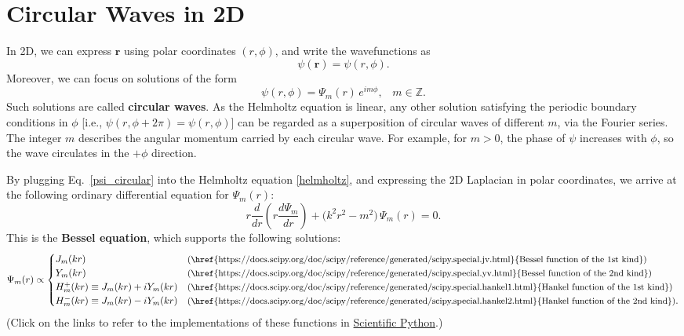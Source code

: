 \documentclass[pra,12pt]{revtex4-2}
\begin{document}
\section{Circular Waves in 2D}
\label{circular_waves}

In 2D, we can express $\mathbf{r}$ using polar coordinates $(r,
\phi)$, and write the wavefunctions as
\begin{equation}
  \psi(\mathbf{r}) = \psi(r,\phi).
\end{equation}
Moreover, we can focus on solutions of the form
\begin{equation}
  \psi(r,\phi) = \Psi_m(r)\, e^{im\phi}, \;\;\;m \in\mathbb{Z}.
  \label{psi_circular}
\end{equation}
Such solutions are called \textbf{circular waves}.  As the Helmholtz
equation is linear, any other solution satisfying the periodic
boundary conditions in $\phi$ [i.e., $\psi(r,\phi + 2\pi) = \psi(r,
  \phi)$] can be regarded as a superposition of circular waves of
different $m$, via the Fourier series.  The integer $m$ describes the
angular momentum carried by each circular wave.  For example, for $m >
0$, the phase of $\psi$ increases with $\phi$, so the wave circulates
in the $+\phi$ direction.

By plugging Eq.~\eqref{psi_circular} into the Helmholtz equation
\eqref{helmholtz}, and expressing the 2D Laplacian in polar
coordinates, we arrive at the following ordinary differential equation
for $\Psi_m(r)$:
\begin{equation}
  r \frac{d}{dr}\!\left(r \frac{d\Psi_m}{dr} \right)
  + \Big(k^2 r^2 - m^2 \Big)\, \Psi_m(r) = 0.
  \label{besseleq}
\end{equation}
This is the \textbf{Bessel equation}, which supports the following
solutions:
\begin{equation}
  \Psi_m(r) \propto \begin{cases}
    J_m(kr) &\text{\small(\href{https://docs.scipy.org/doc/scipy/reference/generated/scipy.special.jv.html}{Bessel function of the 1st kind})} \\
    Y_m(kr) &\text{\small(\href{https://docs.scipy.org/doc/scipy/reference/generated/scipy.special.yv.html}{Bessel function of the 2nd kind})} \\
    H_m^+(kr) \equiv J_m(kr) + i Y_m(kr) &\text{\small(\href{https://docs.scipy.org/doc/scipy/reference/generated/scipy.special.hankel1.html}{Hankel function of the 1st kind})} \\
    H_m^-(kr) \equiv J_m(kr) - i Y_m(kr) &\text{\small(\href{https://docs.scipy.org/doc/scipy/reference/generated/scipy.special.hankel2.html}{Hankel function of the 2nd kind})}.
  \end{cases}
\end{equation}
(Click on the links to refer to the implementations of these functions
in \href{https://scipy.org/}{Scientific Python}.)
\end{document}
